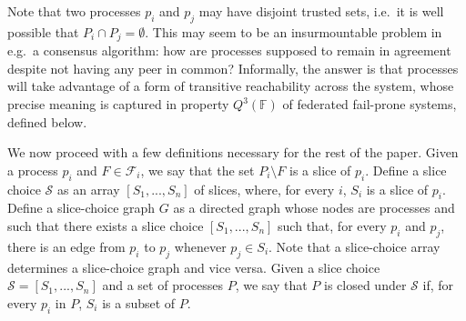\documentclass[11pt]{article}
\begin{document}
Note that two processes $p_i$ and $p_j$ may have disjoint trusted sets, i.e.\ it is well possible that $P_i\cap P_j=\emptyset$. This may seem to be an insurmountable problem in e.g.\ a consensus algorithm: how are processes supposed to remain in agreement despite not having any peer in common? Informally, the answer is that processes will take advantage of a form of transitive reachability across the system, whose precise meaning is captured in property $Q^3(\mathbb{F})$ of federated fail-prone systems, defined below.

We now proceed with a few definitions necessary for the rest of the paper.
Given a process $p_i$ and $F\in \mathcal{F}_i$, we say that the set $P_i\setminus F$ is a slice of $p_i$.
Define a slice choice $\mathcal{S}$ as an array $\left[S_1,...,S_n\right]$ of slices, where, for every $i$, $S_i$ is a slice of $p_i$.
Define a slice-choice graph $G$ as a directed graph whose nodes are processes and such that there exists a slice choice $\left[S_1,...,S_n\right]$ such that, for every $p_i$ and $p_j$, there is an edge from $p_i$ to $p_j$ whenever $p_j\in S_i$. Note that a slice-choice array determines a slice-choice graph and vice versa.
Given a slice choice $\mathcal{S}=\left[S_1,...,S_n\right]$ and a set of processes $P$, we say that $P$ is closed under $\mathcal{S}$ if, for every $p_i$ in $P$, $S_i$ is a subset of $P$.



\end{document}
